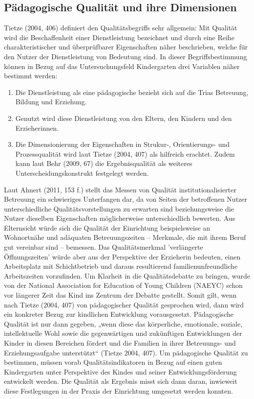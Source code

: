 \subsection{Pädagogische Qualität und ihre Dimensionen}

Tietze (2004, 406) definiert den Qualitätsbegriffs sehr allgemein: Mit Qualität wird die Beschaffenheit einer Dienstleistung bezeichnet und durch eine Reihe charakteristischer und überprüfbarer Eigenschaften näher beschrieben, welche für den Nutzer der Dienstleistung von Bedeutung sind. In dieser Begriffsbestimmung können in Bezug auf das Untersuchungsfeld Kindergarten drei Variablen näher bestimmt werden:

\begin{enumerate}
\item Die Dienstleistung als eine pädagogische bezieht sich auf die Trias Betreuung, Bildung und Erziehung.
\item Genutzt wird diese Dienstleistung von den Eltern, den Kindern und den Erzieherinnen.
\item Die Dimensionierung der Eigenschaften in Strukur-, Orientierungs- und Prozessqualität wird laut  Tietze (2004, 407) als hilfreich erachtet. Zudem kann laut Behr (2009, 67) die Ergebnisqualität als weiteres Unterscheidungskonstrukt festgelegt werden.
\end{enumerate}

Laut Ahnert (2011, 153 f.) stellt das Messen von Qualität institutionalisierter Betreuung ein schwieriges Unterfangen dar, da von Seiten der betroffenen Nutzer unterschiedliche Qualitätsvorstellungen zu erwarten sind beziehungsweise die Nutzer dieselben Eigenschaften möglicherweise unterschiedlich bewerten. Aus Elternsicht würde sich die Qualität der Einrichtung beispielsweise an Wohnortnähe und adäquaten Betreuungszeiten -- Merkmale, die mit ihrem Beruf gut vereinbar sind -- bemessen. Das Qualitätsmerkmal 'verlängerte Öffnungszeiten' würde aber aus der Perspektive der Erzieherin bedeuten, einen Arbeitsplatz mit Schichtbetrieb und daraus resultierend familienunfreundliche Arbeitszeiten vorzufinden.  
Um Klarheit in die Qualitätsdebatte zu bringen, wurde von der National Association for Education of Young Children (NAEYC) schon vor längerer Zeit das Kind ins Zentrum der Debatte gestellt. Somit gilt, wenn nach Tietze (2004, 407) von pädagogischer Qualität gesprochen wird, dann wird ein konkreter Bezug zur kindlichen Entwicklung vorausgesetzt. Pädagogische Qualität ist nur dann gegeben, „wenn diese das körperliche, emotionale, soziale, intellektuelle Wohl sowie die gegenwärtigen und zukünftigen Entwicklungen der Kinder in diesen Bereichen fördert und die Familien in ihrer Betreuungs- und Erziehungsaufgabe unterstützt“ (Tietze 2004, 407). Um pädagogische Qualität zu bestimmen, müssen vorab Qualitätsindikatoren in Bezug auf einen guten Kindergarten unter Perspektive des Kindes und seiner Entwicklungsförderung entwickelt werden. Die Qualität als Ergebnis misst sich dann daran, inwieweit diese Festlegungen in der Praxis der Einrichtung umgesetzt werden konnten. 

